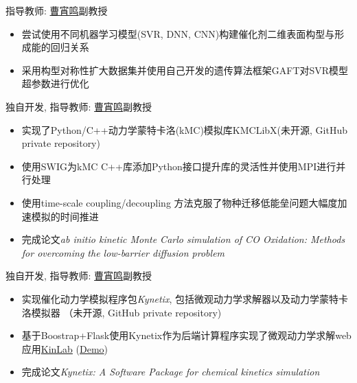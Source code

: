 \documentclass{resume}
\begin{document}
 {指导教师: \faLink \href{http://chem.ecust.edu.cn/2014/1211/c6655a50467/page.htm}{曹宵鸣}副教授}
\begin{onehalfspacing}
\begin{itemize}
    \item 尝试使用不同机器学习模型(SVR, DNN, CNN)构建催化剂二维表面构型与形成能的回归关系
    \item 采用构型对称性扩大数据集并使用自己开发的遗传算法框架GAFT对SVR模型超参数进行优化
\end{itemize}
\end{onehalfspacing}

 {独自开发, 指导教师: \faLink \href{http://chem.ecust.edu.cn/2014/1211/c6655a50467/page.htm}{曹宵鸣}副教授}
\begin{onehalfspacing}
\begin{itemize}
    \item 实现了Python/C++动力学蒙特卡洛(kMC)模拟库KMCLibX(未开源, GitHub private repository)
    \item 使用SWIG为kMC C++库添加Python接口提升库的灵活性并使用MPI进行并行处理
    \item 使用time-scale coupling/decoupling 方法克服了物种迁移低能垒问题大幅度加速模拟的时间推进
    \item 完成论文\emph{ab initio kinetic Monte Carlo simulation of CO Oxidation: Methods for overcoming the low-barrier diffusion problem}
\end{itemize}
\end{onehalfspacing}

 {独自开发, 指导教师: \faLink \href{http://chem.ecust.edu.cn/2014/1211/c6655a50467/page.htm}{曹宵鸣}副教授}
\begin{onehalfspacing}
\begin{itemize}
    \item 实现催化动力学模拟程序包\emph{Kynetix}, 包括微观动力学求解器以及动力学蒙特卡洛模拟器 （未开源, GitHub private repository)
    \item 基于Boostrap+Flask使用Kynetix作为后端计算程序实现了微观动力学求解web应用\faLink \href{https://github.com/PytLab/KinLab}{KinLab} (\faLink \href{http://123.206.225.154:5000/}{Demo})
    \item 完成论文\emph{Kynetix: A Software Package for chemical kinetics simulation}
\end{itemize}
\end{onehalfspacing}
\end{document}
